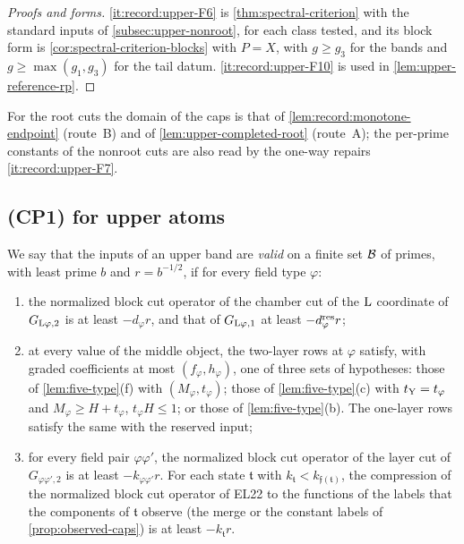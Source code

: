 \begin{proof}[Proofs and forms]
\ref{it:record:upper-F6} is \cref{thm:spectral-criterion} with the standard inputs of
\cref{subsec:upper-nonroot}, for each class tested, and its block form is
\cref{cor:spectral-criterion-blocks} with $P=X$, with $g\ge g_3$ for the bands and
$g\ge\max(g_1,g_3)$ for the tail datum. \ref{it:record:upper-F10} is used in
\cref{lem:upper-reference-rp}.
\end{proof}

For the root cuts the domain of the caps is that of
\cref{lem:record:monotone-endpoint} (route~B) and of \cref{lem:upper-completed-root}
(route~A); the per-prime constants of the nonroot cuts are also read by the one-way
repairs \ref{it:record:upper-F7}.

\subsection{(CP1) for upper atoms}\label{subsec:upper-reference-rp}

We say that the inputs of an upper band are \emph{valid} on a finite set $\mathcal B$ of
primes, with least prime $b$ and $r=b^{-1/2}$, if for every field type $\varphi$:
\begin{enumerate}[label=(V\arabic*)]
\item\label{it:upper-valid-root} the normalized block cut operator of the chamber cut
 of the $\rm L$ coordinate of $G_{{\rm L}\varphi,2}$ is at least $-d_\varphi r$, and
 that of $G_{{\rm L}\varphi,1}$ at least $-d^{\rm res}_\varphi r$;
\item\label{it:upper-valid-rows} at every value of the middle object, the two-layer
 rows at $\varphi$ satisfy, with graded coefficients at most $(f_\varphi,h_\varphi)$,
 one of three sets of hypotheses: those of \cref{lem:five-type}(f) with
 $(M_\varphi,t_\varphi)$; those of \cref{lem:five-type}(c) with $t_{\rm Y}=t_\varphi$
 and $M_\varphi\ge H+t_\varphi$, $t_\varphi H\le1$; or those of
 \cref{lem:five-type}(b). The one-layer rows satisfy the same with the reserved input;
\item\label{it:upper-valid-layer} for every field pair $\varphi\varphi'$, the normalized
 block cut operator of the layer cut of $G_{\varphi\varphi',2}$ is at least
 $-k_{\varphi\varphi'}r$. For each state $\mathfrak t$ with
 $k_{\mathfrak t}<k_{\mathfrak f(\mathfrak t)}$, the compression of the normalized
 block cut operator of EL22 to the functions of the labels that the components of
 $\mathfrak t$ observe (the merge or the constant labels of \cref{prop:observed-caps})
 is at least $-k_{\mathfrak t}r$.
\end{enumerate}

